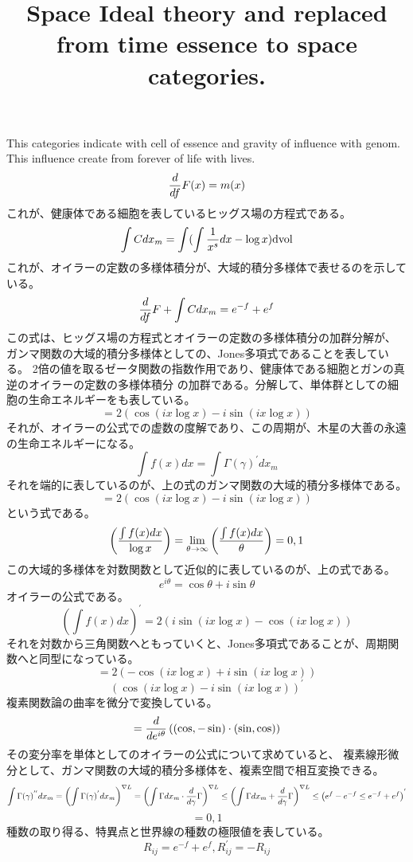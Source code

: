 \documentclass{jsarticle}
\begin{document}
\title{Space Ideal theory and replaced from time essence to space categories.}
\author{}
\date{}
\maketitle

 This categories indicate with cell of essence and gravity of influence with genom.
 This influence create from forever of life with lives.
$$ {d \over df}F(x) = m(x) $$
これが、健康体である細胞を表しているヒッグス場の方程式である。
$$ \int Cdx_m = \int(\int{1 \over x^s}dx - \log x)\mathrm{dvol} $$
これが、オイラーの定数の多様体積分が、大域的積分多様体で表せるのを示している。
$$ {d \over df}F + \int Cdx_m = e^{-f} + e^{f} $$
この式は、ヒッグス場の方程式とオイラーの定数の多様体積分の加群分解が、
ガンマ関数の大域的積分多様体としての、Jones多項式であることを表している。
2倍の値を取るゼータ関数の指数作用であり、健康体である細胞とガンの真逆のオイラーの定数の多様体積分
の加群である。分解して、単体群としての細胞の生命エネルギーをも表している。
$$ = 2 (\cos (i x \log x) - i \sin(i x \log x)) $$
それが、オイラーの公式での虚数の度解であり、この周期が、木星の大善の永遠の生命エネルギーになる。
$$ \int f(x)dx = \int \Gamma(\gamma)^{'}dx_m $$
それを端的に表しているのが、上の式のガンマ関数の大域的積分多様体である。
$$ = 2 (\cos (i x \log x) - i \sin(i x \log x)) $$
という式である。
$$ \left({{\int f(x) dx} \over \log x}\right) = \lim_{\theta \to \infty}
\left({{\int f(x) dx} \over \theta}\right) = 0,1 $$
この大域的多様体を対数関数として近似的に表しているのが、上の式である。
$$ e^{i \theta} = \cos \theta + i \sin \theta $$
オイラーの公式である。
$$ \left({\int f(x) dx}\right)^{'} = 2 (i \sin(i x \log x) - \cos (i x \log
x)) $$
それを対数から三角関数へともっていくと、Jones多項式であることが、周期関数へと同型になっている。
$$ = 2(- \cos(i x \log x) + i \sin(i x \log x)) $$
$$ (\cos (i x \log x) - i \sin(i x \log x))^{'} $$
複素関数論の曲率を微分で変換している。
$$ = {d \over {d {e^{i\theta}}}}\left((\cos, - \sin )\cdot
(\sin, \cos)\right) $$
その変分率を単体としてのオイラーの公式について求めていると、
複素線形微分として、ガンマ関数の大域的積分多様体を、複素空間で相互変換できる。
$$ \int \Gamma(\gamma)^{''}dx_m = \left({\int \Gamma(\gamma)^{'}}dx_m
\right)^{\nabla L} = \left({{\int \Gamma dx_m} \cdot {{d \over d\gamma}
\Gamma}}\right)^{\nabla L} \le
\left({\int \Gamma dx_m + {d \over d\gamma}\Gamma}\right)^{\nabla L} \le
\left({e^{f} - e^{-f}} \le {e^{-f} + e^{f}}\right)^{'} $$
$$ = 0,1 $$
種数の取り得る、特異点と世界線の種数の極限値を表している。
$$ R_{ij} = e^{-f} + e^{f}, R^{'}_{ij} = - R_{ij} $$
\end{document}
